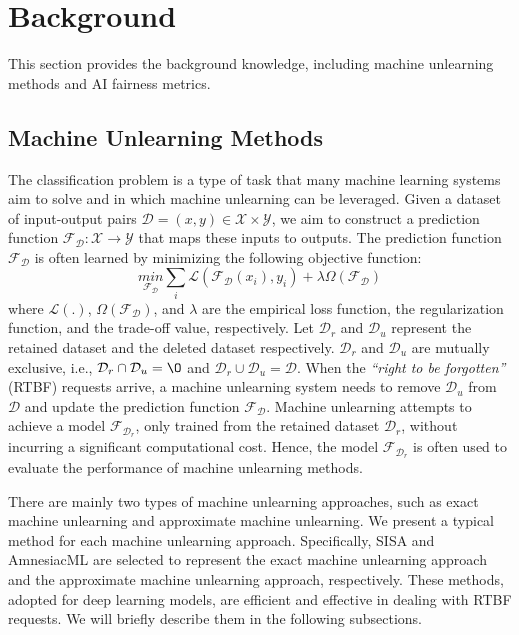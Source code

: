 

\section{Background}
\label{sec:background}


This section provides the background knowledge, including machine unlearning methods and AI fairness metrics.

\subsection{Machine Unlearning Methods}
\label{sec:unlearning}


The classification problem is a type of task that many machine learning systems aim to solve and in which machine unlearning can be leveraged.
Given a dataset of input-output pairs $\mathcal{D}= (x, y) \in \mathcal{X} \times \mathcal{Y}$, we aim to construct a prediction function $\mathcal{F}_{\mathcal{D}}: \mathcal{X} \rightarrow \mathcal{Y}$ that maps these inputs to outputs. The prediction function $\mathcal{F}_{\mathcal{D}}$ is often learned by minimizing the following objective function:
\begin{equation}
\underset{\mathcal{F}_{\mathcal{D}}}{min} \sum_{i}\mathcal{L}(\mathcal{F}_{\mathcal{D}}(x_i), y_i) + \lambda\Omega(\mathcal{F}_{\mathcal{D}})
\end{equation}
where $\mathcal{L}(.)$, $\Omega(\mathcal{F}_{\mathcal{D}})$, and $\lambda$ are the empirical loss function, the regularization function, and the trade-off value, respectively.
Let $\mathcal{D}_{r}$ and $\mathcal{D}_{u}$ represent the retained dataset and the deleted dataset respectively. $\mathcal{D}_{r}$ and $\mathcal{D}_{u}$ are mutually exclusive, i.e., $\mathcal{D}_{r} \cap \mathcal{D}_{u} = \O \mathcal{}$ and $\mathcal{D}_{r} \cup \mathcal{D}_{u} = \mathcal{D}$. When the \textit{``right to be forgotten''} (RTBF) requests arrive, a machine unlearning system needs to remove $\mathcal{D}_{u}$ from $\mathcal{D}$ and update the prediction function $\mathcal{F}_{\mathcal{D}}$. Machine unlearning attempts to achieve a model $\mathcal{F}_{\mathcal{D}_{r}}$, only trained from the retained dataset $\mathcal{D}_{r}$, without incurring a significant computational cost. Hence, the model $\mathcal{F}_{\mathcal{D}_{r}}$ is often used to evaluate the performance of machine unlearning methods. 

There are mainly two types of machine unlearning approaches, such as exact machine unlearning and approximate machine unlearning.
We present a typical method for each machine unlearning approach. Specifically, SISA and AmnesiacML are selected to represent the exact machine unlearning approach and the approximate machine unlearning approach, respectively. These methods, adopted for deep learning models, are efficient and effective in dealing with RTBF requests. We will briefly describe them in the following subsections.




